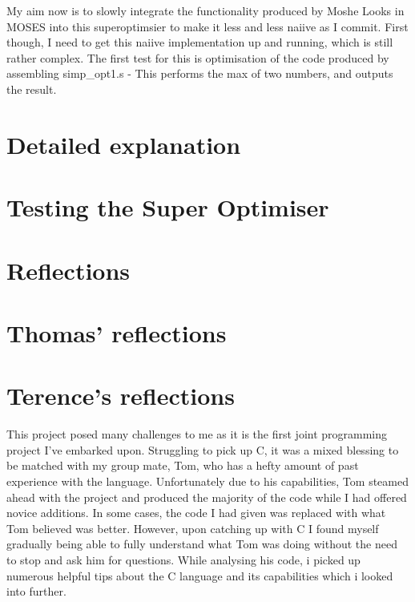 \documentclass[11pt]{article}
\begin{document}
My aim now is to slowly integrate the functionality produced by Moshe Looks in MOSES into this superoptimsier to make it less and less naiive as I commit. First though, I need to get this naiive implementation up and running, which is still rather complex. 
The first test for this is optimisation of the code produced by assembling simp_opt1.s - This performs the max of two numbers, and outputs the result.

\maketitle

\section{Detailed explanation}


\maketitle

\section{Testing the Super Optimiser}
 
\maketitle

\section{Reflections}
\section{Thomas' reflections}







\section{Terence's reflections}
 This project posed many challenges to me as it is the first joint programming project I've embarked upon. Struggling to pick up C, it was a mixed blessing to be matched with my group mate, Tom, who has a hefty amount of past experience with the language. Unfortunately due to his capabilities, Tom steamed ahead with the project and produced the majority of the code while I had offered novice additions. In some cases, the code I had given was replaced with what Tom believed was better. However, upon catching up with C I found myself gradually being able to fully understand what Tom was doing without the need to stop and ask him for questions. While analysing his code, i picked up numerous helpful tips about the C language and its capabilities which i looked into further.
\end{document}
